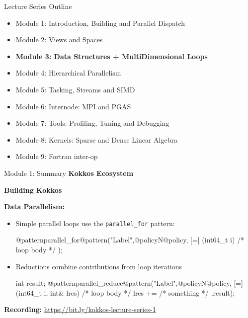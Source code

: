 \begin{frame}{Lecture Series Outline}

\begin{itemize}
        \item Module 1: Introduction, Building and Parallel Dispatch
        \item Module 2: Views and Spaces
	\item \textbf{Module 3: Data Structures + MultiDimensional Loops}
        \item Module 4: Hierarchical Parallelism
        \item Module 5: Tasking, Streams and SIMD
        \item Module 6: Internode: MPI and PGAS
        \item Module 7: Tools: Profiling, Tuning and Debugging
        \item Module 8: Kernels: Sparse and Dense Linear Algebra
        \item Module 9: Fortran inter-op
\end{itemize}
\end{frame}

\begin{frame}[fragile]{Module 1: Summary}
	\textbf{Kokkos Ecosystem}

	\textbf{Building Kokkos}

	\textbf{Data Parallelism:}

	\begin{itemize}
		\item Simple parallel loops use the \texttt{parallel\_for} pattern:
\begin{code}[linebackgroundcolor={\btLstHL<1->{3}{bodyColor}},frame=single]
@patternparallel_for@pattern("Label",@policyN@policy, [=] (int64_t i) {
  /* loop body */
});
\end{code}
\item Reductions combine contributions from loop iterations
\begin{code}[linebackgroundcolor={\btLstHL<1->{3}{bodyColor}},frame=single]
int result;
@patternparallel_reduce@pattern("Label",@policyN@policy, [=] (int64_t i, int& lres) {
   /* loop body */
    lres += /* something */
  },result);
\end{code}

\end{itemize}

	\textbf{Recording:} \url{https://bit.ly/kokkos-lecture-series-1}

\end{frame}



